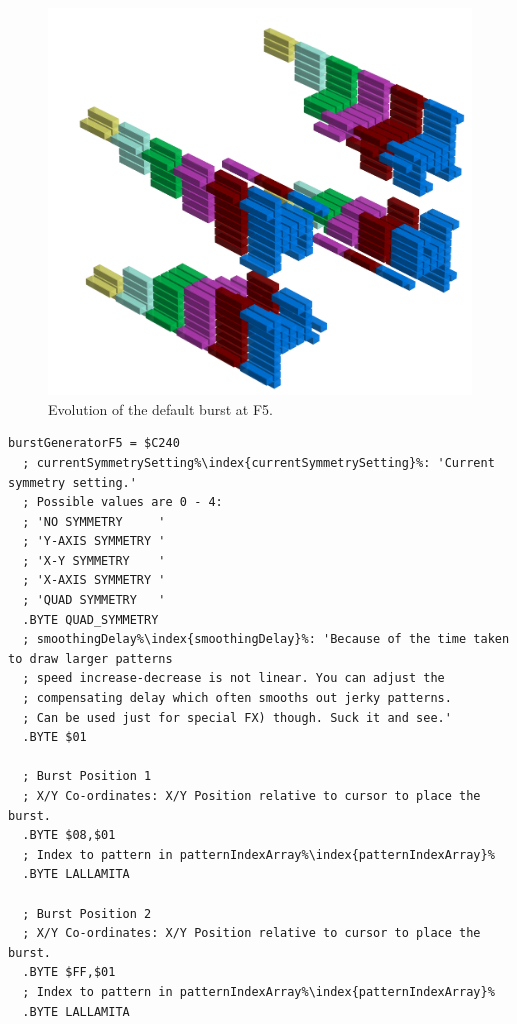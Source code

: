 \clearpage

\clearpage
\begin{figure}[H]
    \centering
    \begin{adjustbox}{width=12cm,center}
      \includegraphics[width=12cm]{src/patterns/bursts/pattern2-45.png}%
    \end{adjustbox}
\caption{Evolution of the default burst at F5.}
\end{figure}
\clearpage

\begin{lstlisting}[caption=Source code for the F5 Burst.,escapechar=\%]
burstGeneratorF5 = $C240
  ; currentSymmetrySetting%\index{currentSymmetrySetting}%: 'Current symmetry setting.'
  ; Possible values are 0 - 4:
  ; 'NO SYMMETRY     '
  ; 'Y-AXIS SYMMETRY '
  ; 'X-Y SYMMETRY    '
  ; 'X-AXIS SYMMETRY '
  ; 'QUAD SYMMETRY   '
  .BYTE QUAD_SYMMETRY
  ; smoothingDelay%\index{smoothingDelay}%: 'Because of the time taken to draw larger patterns
  ; speed increase-decrease is not linear. You can adjust the 
  ; compensating delay which often smooths out jerky patterns. 
  ; Can be used just for special FX) though. Suck it and see.'
  .BYTE $01

  ; Burst Position 1  
  ; X/Y Co-ordinates: X/Y Position relative to cursor to place the burst.
  .BYTE $08,$01
  ; Index to pattern in patternIndexArray%\index{patternIndexArray}%
  .BYTE LALLAMITA

  ; Burst Position 2
  ; X/Y Co-ordinates: X/Y Position relative to cursor to place the burst.
  .BYTE $FF,$01
  ; Index to pattern in patternIndexArray%\index{patternIndexArray}%
  .BYTE LALLAMITA

\end{lstlisting}


